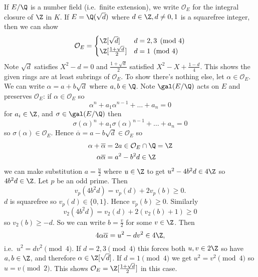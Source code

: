 \documentclass[a4paper]{article}
\renewcommand*{\O}{\mathcal{O}}
\begin{document}
\begin{eg}
  If \(E/\Q\) is a number field (i.e.\ finite extension), we write \(\O_E\) for the integral closure of \(\Z\) in \(K\). If \(E = \Q(\sqrt d)\) where \(d \in \Z, d \neq 0, 1\) is a squarefree integer, then we can show
  \[
    \O_E =
    \begin{cases}
      \Z[\sqrt d] & d = 2, 3 \pmod 4 \\
      \Z[\frac{1 + \sqrt d}{2}] & d = 1 \pmod 4
    \end{cases}
  \]
  Note \(\sqrt d\) satisfies \(X^2 - d = 0\) and \(\frac{1 + \sqrt d}{2}\) satisfied \(X^2 - X + \frac{1 - d}{4}\). This shows the given rings are at least subrings of \(\O_E\). To show there's nothing else, let \(\alpha \in \O_E\). We can write \(\alpha = a + b \sqrt d\) where \(a, b \in \Q\). Note \(\gal(E/\Q)\) acts on \(E\) and preserves \(\O_E\): if \(\alpha \in \O_E\) so
  \[
    \alpha^n + a_1 \alpha^{n - 1} + \dots + a_n = 0
  \]
  for \(a_i \in \Z\), and \(\sigma \in \gal(E/\Q)\) then
  \[
    \sigma(\alpha)^n + a_1 \sigma(\alpha)^{n - 1} + \dots + a_n = 0
  \]
  so \(\sigma(\alpha) \in \O_E\). Hence \(\overline \alpha = a - b\sqrt d \in \O_E\) so
  \begin{align*}
    \alpha + \overline \alpha &= 2a \in \O_E \cap \Q = \Z \\
    \alpha \overline \alpha &= a^2 - b^2d \in \Z
  \end{align*}
  we can make substitution \(a = \frac{u}{2}\) where \(u \in \Z\) to get \(u^2 - 4b^2d \in 4\Z\) so \(4b^2d \in \Z\). Let \(p\) be an odd prime. Then
  \[
    v_p(4b^2d) = v_p(d) + 2v_p(b) \geq 0.
  \]
  \(d\) is squarefree so \(v_p(d) \in \{0, 1\}\). Hence \(v_p(b) \geq 0\). Similarly
  \[
    v_2(4b^2d) = v_2(d) + 2(v_2(b) + 1) \geq 0
  \]
  so \(v_2(b) \geq -d\). So we can write \(b = \frac{v}{2}\) for some \(v \in \Z\). Then
  \[
    4 \alpha \overline \alpha = u^2 - dv^2 \in 4\Z,
  \]
  i.e.\ \(u^2 = dv^2 \pmod 4\). If \(d = 2, 3 \pmod 4\) this forces both \(u, v \in 2\Z\) so have \(a, b \in \Z\), and therefore \(\alpha \in \Z[\sqrt d]\). If \(d = 1 \pmod 4\) we get \(u^2 = v^2 \pmod 4\) so \(u = v \pmod 2\). This shows \(\O_E = \Z[\frac{1 + \sqrt d}{2}]\) in this case.


\end{eg}
\end{document}

